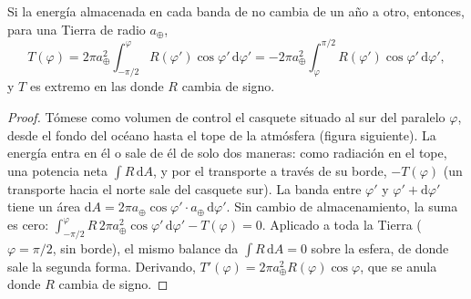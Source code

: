 \begin{proposition}\label{prop:b1:radiation-heat-transport:mht}
Si la energía almacenada en cada banda de  no cambia de un año a otro, entonces, para una Tierra de radio $a_\oplus$,
\[
  T(\varphi) = 2\pi a_\oplus^2\int_{-\pi/2}^{\varphi} R(\varphi')\cos\varphi'\,
  \mathrm d\varphi' = -2\pi a_\oplus^2\int_{\varphi}^{\pi/2} R(\varphi')\cos
  \varphi'\,\mathrm d\varphi' ,
\]
y $T$ es extremo en las  donde $R$ cambia de signo.
\end{proposition}

\begin{proof}
Tómese como volumen de control el casquete situado al sur del paralelo $\varphi$, desde el fondo del océano hasta el tope de la atmósfera (figura siguiente). La energía entra en él o sale de él de solo dos maneras: como radiación en el tope, una potencia neta
$\int R\,\mathrm dA$, y por el transporte a través de su borde, $-T(\varphi)$ (un transporte hacia el norte sale del casquete sur). La banda entre $\varphi'$ y
$\varphi' + \mathrm d\varphi'$ tiene un área $\mathrm dA = 2\pi a_\oplus\cos\varphi'
\cdot a_\oplus\,\mathrm d\varphi'$. Sin cambio de almacenamiento, la suma es cero:
$\int_{-\pi/2}^{\varphi} R\,2\pi a_\oplus^2\cos\varphi'\,\mathrm d\varphi' -
T(\varphi) = 0$. Aplicado a toda la Tierra ($\varphi = \pi/2$, sin borde), el mismo balance da $\int R\,\mathrm dA = 0$ sobre la esfera, de donde sale la segunda forma. Derivando, $T'(\varphi) = 2\pi a_\oplus^2 R(\varphi)\cos\varphi$, que se anula donde $R$ cambia de signo.
\end{proof}

